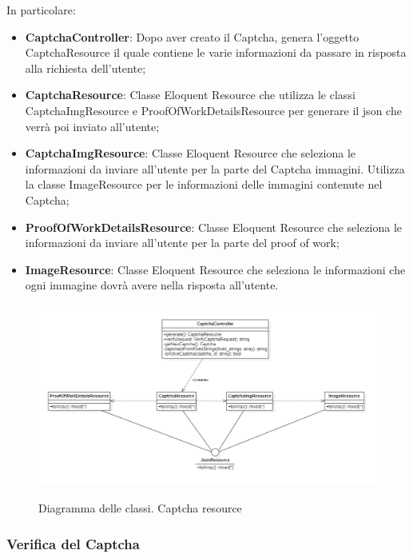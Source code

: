 In particolare:
\begin{itemize}
	\item \textbf{CaptchaController}: Dopo aver creato il Captcha, genera l'oggetto CaptchaResource il quale contiene le varie informazioni da passare in risposta alla richiesta dell'utente;
	\item \textbf{CaptchaResource}: Classe Eloquent Resource che utilizza le classi CaptchaImgResource e ProofOfWorkDetailsResource per generare il json che verrà poi inviato all'utente;
	\item \textbf{CaptchaImgResource}: Classe Eloquent Resource che seleziona le informazioni da inviare all'utente per la parte del Captcha immagini. Utilizza la classe ImageResource per le informazioni delle immagini contenute nel Captcha;
	\item \textbf{ProofOfWorkDetailsResource}: Classe Eloquent Resource che seleziona le informazioni da inviare all'utente per la parte del proof of work;
	\item \textbf{ImageResource}: Classe Eloquent Resource che seleziona le informazioni che ogni immagine dovrà avere nella risposta all'utente.
	
	
\end{itemize}

\begin{figure}[H]
	\centering
	\includegraphics[scale = 0.6]{img/captcha_resource.png}\\
	\caption{Diagramma delle classi. Captcha resource}
\end{figure}
\newpage

\subsubsection{Verifica del Captcha}


